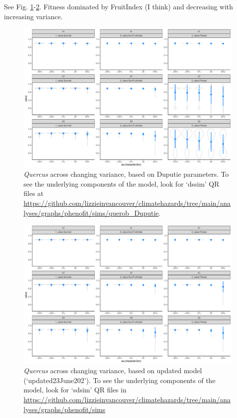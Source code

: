 \documentclass[11pt,letter]{article}
\begin{document}
See Fig. \ref{fig:simssdDup}-\ref{fig:simssdUp}. Fitness dominated by FruitIndex (I think) and decreasing with increasing variance.
\begin{figure}[h!]
 \begin{center}
\noindent \includegraphics[width=1\textwidth]{..//analyses/graphs/phenofit/sims/querob_Duputie/sdsim_3metricsQR.pdf}
  \caption{\emph{Quercus} across changing variance, based on Duputie parameters. To see the underlying components of the model, look for `dssim' QR files at \url{https://github.com/lizzieinvancouver/climatehazards/tree/main/analyses/graphs/phenofit/sims/querob_Duputie}.}
  \label{fig:simssdDup}
  \end{center}
\end{figure}

\begin{figure}[h!]
 \begin{center}
\noindent \includegraphics[width=1\textwidth]{..//analyses/graphs/phenofit/sims/metrics3/sdsim_3metricsQR.pdf}
  \caption{\emph{Quercus} across changing variance, based on updated model (`updated23June202'). To see the underlying components of the model, look for `sdsim' QR files in \url{https://github.com/lizzieinvancouver/climatehazards/tree/main/analyses/graphs/phenofit/sims}}
  \label{fig:simssdUp}
  \end{center}
\end{figure}
\end{document}
